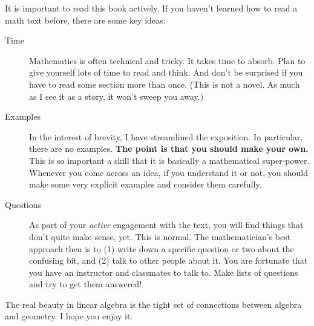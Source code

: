 \documentclass[elementsmain.tex]{subfiles}
\begin{document}
It is important to read this book actively. 
If you haven't learned how to read a math text before, there are some key ideas:
\begin{description}
\item[Time] Mathematics is often technical and tricky. 
It takes time to absorb. 
Plan to give yourself lots of time to read and think. 
And don't be surprised if you have to read some section more than once. 
(This is not a novel. 
As much as I see it as a story, it won't sweep you away.)
\item[Examples] In the interest of brevity, I have streamlined the exposition. 
In particular, there are no examples. 
\textbf{The point is that you should make your own.} 
This is so important a skill that it is basically a mathematical super-power. 
Whenever you come across an idea, if you understand it or not, you should make some very explicit examples and consider them carefully. 
\item[Questions] As part of your \emph{active} engagement with the text, you will find things that don't quite make sense, yet. 
This is normal. 
The mathematician's best approach then is to (1) write down a specific question or two about the confusing bit, and (2) talk to other people about it. 
You are fortunate that you have an instructor and classmates to talk to. 
Make lists of questions and try to get them answered! 
\end{description}

The real beauty in linear algebra is the tight set of connections between algebra and geometry.
I hope you enjoy it.


\clearpage
\end{document}
